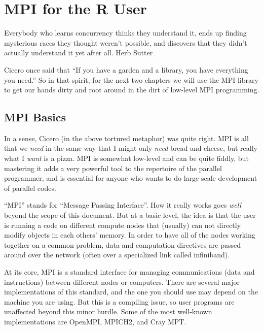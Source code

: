 \chapter{MPI for the R User}
\label{chp:mpi_for_the_r_user}

\inspire%
{Everybody who learns concurrency thinks they understand it, ends up finding mysterious races they 
thought weren't possible, and discovers that they didn't actually understand it yet after all.}%
{Herb Sutter}
\vspace{0.5cm}


Cicero once said that ``If you have a garden and a library, you have
everything you need.'' So in that spirit, for the next two chapters we will
use the MPI library to get our hands dirty and root around in the dirt of
low-level MPI programming.

\section{MPI Basics}

In a sense, Cicero (in the above tortured metaphor) was quite right. MPI is
all that we \emph{need} in the same way that I might only \emph{need} bread
and cheese, but really what I \emph{want} is a pizza. MPI is somewhat
low-level and can be quite fiddly, but mastering it adds a very powerful
tool to the repertoire of the parallel  programmer, and is
essential for anyone who wants to do large scale development of parallel
codes.  

``MPI'' stands for ``Message Passing Interface''. How it really works goes \emph{well} beyond the scope of 
this document. But at a basic level, the idea is that the user is running a 
code on different compute nodes that (usually) can not directly modify objects 
in each others' memory.  In order to have all of the nodes working together on 
a common problem, data and computation directives are passed around over the 
network (often over a specialized link called infiniband).  

At its core, MPI is a standard interface for managing communications
(data and instructions) between different nodes or computers.
There are several major implementations of this standard, and the one
you should use may depend on the machine you are using.
But this is a compiling issue, so user programs are unaffected beyond
this minor hurdle. Some of the most well-known implementations are
OpenMPI, MPICH2, and
Cray MPT.

